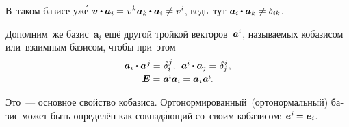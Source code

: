\begin{otherlanguage}{russian}
\vspace{0.1em}\normalsize\setlength{\abovedisplayskip}{2pt}\setlength{\belowdisplayskip}{2pt}
В~таком базисе уж\'{е} ${\bm{v} \dotp \bm{a}_i \hspace{-0.1ex} = \hspace{0.1ex} v^{k} \bm{a}_k \hspace{-0.1ex} \dotp \bm{a}_i \neq\vspace{0.2ex} v^{i}}$\hspace{-0.25ex}, ведь~тут ${\bm{a}_i \hspace{-0.1ex} \dotp \bm{a}_k \neq\vspace{0.2ex} \delta_{ik}}$.

Дополним~же \hbox{базис}~${\bm{a}_i}$ ещё другой тройкой векторов~\hbox{${\bm{a}^{\hspace{-0.05ex}i}}$\hspace{-0.25ex},} \hbox{называемых} кобазисом или~взаимным базисом, чтобы при~этом
\vspace{0.1em}\begin{equation}\label{fundamentalpropertyofcobasis}
\begin{array}{c}
\bm{a}_i \dotp \bm{a}^{\hspace{0.1ex}j} \hspace{-0.1ex} = \hspace{0.1ex} \delta_i^{\hspace{0.1ex}j} , \:\:
\bm{a}^{\hspace{-0.05ex}i} \hspace{-0.1ex} \dotp \bm{a}_j \hspace{-0.1ex} = \hspace{0.1ex} \delta_{\hspace{-0.1ex}j}^{\hspace{0.1ex}i} \hspace{0.16ex}, \\[0.2em]
\bm{E} = \bm{a}^{\hspace{-0.1ex}i} \hspace{-0.1ex} \bm{a}_i \hspace{-0.1ex} = \bm{a}_i \hspace{0.1ex} \bm{a}^{\hspace{-0.1ex}i} \hspace{-0.2ex}.
\end{array}\end{equation}

\vspace{-0.1em}\noindent Это~--- основное свойство кобазиса. Орто\-нормирован\-ный~(орто\-нормаль\-ный) базис может быть определён как совпад\'{а}ющий со~своим кобазисом: ${\bm{e}^{\hspace{0.05ex}i} \hspace{-0.2ex} = \bm{e}_{i}}$.


\end{otherlanguage}
